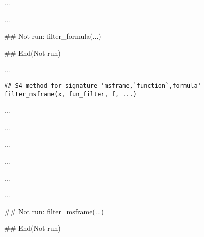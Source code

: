 \documentclass[letterpaper]{book}
\begin{document}
%
\begin{Details}\relax
...
\end{Details}
%
\begin{Value}
...
\end{Value}
%
\begin{SeeAlso}\relax
{}
\end{SeeAlso}
%
\begin{Examples}
\begin{ExampleCode}
## Not run: 
filter_formula(...)

## End(Not run)
\end{ExampleCode}
\end{Examples}
%
\begin{Description}\relax
...
\end{Description}
%
\begin{Usage}
\begin{verbatim}
## S4 method for signature 'msframe,`function`,formula'
filter_msframe(x, fun_filter, f, ...)
\end{verbatim}
\end{Usage}
%
\begin{Arguments}
\begin{ldescription}
\item[\code{x}] ...

\item[\code{fun\_filter}] ...

\item[\code{f}] ...

\item[\code{...}] ...
\end{ldescription}
\end{Arguments}
%
\begin{Details}\relax
...
\end{Details}
%
\begin{Value}
...
\end{Value}
%
\begin{SeeAlso}\relax
{}
\end{SeeAlso}
%
\begin{Examples}
\begin{ExampleCode}
## Not run: 
filter_msframe(...)

## End(Not run)
\end{ExampleCode}
\end{Examples}
\end{document}

